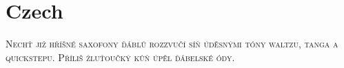 

\presection\section*{\checkyes Czech}\postsection

\textsc{Nechť již hříšné saxofony ďáblů rozzvučí síň úděsnými 
tóny waltzu, tanga a quickstepu. Příliš žluťoučký kůň úpěl ďábelské ódy.}